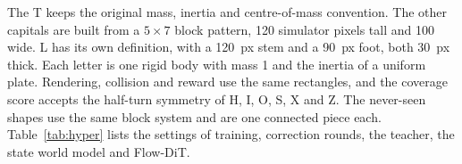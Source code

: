 \documentclass[10pt,twocolumn,letterpaper]{article}
\begin{document}
The T keeps the original mass, inertia and centre-of-mass convention. The other capitals are built from a $5\times7$
block pattern, 120 simulator pixels tall and 100 wide. L has its own definition, with a 120~px stem and a 90~px foot,
both 30~px thick. Each letter is one rigid body with mass 1 and the inertia of a uniform plate. Rendering,
collision and reward use the same rectangles, and the coverage score accepts the half-turn symmetry of H, I, O, S, X and
Z. The never-seen shapes use the same block system and are one connected piece each. Table~\ref{tab:hyper} lists the
settings of training, correction rounds, the teacher, the state world model and Flow-DiT.

\end{document}
